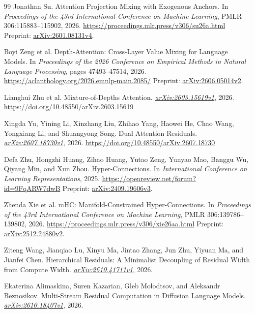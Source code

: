 \documentclass[11pt,letterpaper]{article}
\begin{document}
\begin{thebibliography}{99}
Jonathan Su.
\newblock Attention Projection Mixing with Exogenous Anchors.
\newblock In \emph{Proceedings of the 43rd International Conference on Machine Learning}, PMLR 306:115883--115902, 2026.
\newblock \url{https://proceedings.mlr.press/v306/su26a.html}
\newblock Preprint: \href{https://arxiv.org/abs/2601.08131v4}{arXiv:2601.08131v4}.

Boyi Zeng et al.
\newblock Depth-Attention: Cross-Layer Value Mixing for Language Models.
\newblock In \emph{Proceedings of the 2026 Conference on Empirical Methods in Natural Language Processing}, pages 47493--47514, 2026.
\newblock \url{https://aclanthology.org/2026.emnlp-main.2085/}
\newblock Preprint: \href{https://arxiv.org/abs/2606.05014v2}{arXiv:2606.05014v2}.

Lianghui Zhu et al.
\newblock Mixture-of-Depths Attention.
\newblock \href{https://arxiv.org/abs/2603.15619v1}{\emph{arXiv:2603.15619v1}}, 2026.
\newblock \url{https://doi.org/10.48550/arXiv.2603.15619}

Xingda Yu, Yining Li, Xinzhang Liu, Zhihao Yang, Haowei He, Chao Wang, Yongxiang Li, and Shuangyong Song.
\newblock Dual Attention Residuals.
\newblock \href{https://arxiv.org/abs/2607.18730v1}{\emph{arXiv:2607.18730v1}}, 2026.
\newblock \url{https://doi.org/10.48550/arXiv.2607.18730}

Defa Zhu, Hongzhi Huang, Zihao Huang, Yutao Zeng, Yunyao Mao, Banggu Wu, Qiyang Min, and Xun Zhou.
\newblock Hyper-Connections.
\newblock In \emph{International Conference on Learning Representations}, 2025.
\newblock \url{https://openreview.net/forum?id=9FqARW7dwB}
\newblock Preprint: \href{https://arxiv.org/abs/2409.19606v3}{arXiv:2409.19606v3}.

Zhenda Xie et al.
\newblock mHC: Manifold-Constrained Hyper-Connections.
\newblock In \emph{Proceedings of the 43rd International Conference on Machine Learning}, PMLR 306:139786--139802, 2026.
\newblock \url{https://proceedings.mlr.press/v306/xie26aa.html}
\newblock Preprint: \href{https://arxiv.org/abs/2512.24880v2}{arXiv:2512.24880v2}.

Ziteng Wang, Jianqiao Lu, Xinyu Ma, Jintao Zhang, Jun Zhu, Yiyuan Ma, and Jianfei Chen.
\newblock Hierarchical Residuals: A Minimalist Decoupling of Residual Width from Compute Width.
\newblock \href{https://arxiv.org/abs/2610.41711v1}{\emph{arXiv:2610.41711v1}}, 2026.

Ekaterina Alimaskina, Suren Kazarian, Gleb Molodtsov, and Aleksandr Beznosikov.
\newblock Multi-Stream Residual Computation in Diffusion Language Models.
\newblock \href{https://arxiv.org/abs/2610.18407v1}{\emph{arXiv:2610.18407v1}}, 2026.


\end{thebibliography}
\end{document}
